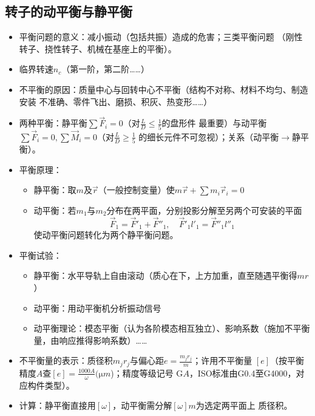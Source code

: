 \documentclass[12pt,a4paper]{article}
\newcommand{\tightlist}{\setlength{\parskip}{0pt}\setlength{\itemsep}{0pt}}
\newcommand{\hint}[1]{\textsf{（#1）}}
\newcommand{\minor}[1]{{\color{gray} #1}}
\newcommand{\then}{$\to$}
\begin{document}
\subsection{转子的动平衡与静平衡}
\begin{itemize}\tightlist
    \item 平衡问题的意义：减小振动\hint{包括共振}造成的危害；三类平衡问题\minor{
    \hint{刚性转子、挠性转子、机械在基座上的平衡}}。
    \item 临界转速$n_c$\hint{第一阶，第二阶……}
    \item 不平衡的原因：质量中心与回转中心不平衡\hint{结构不对称、材料不均匀、制造安装
    不准确、零件飞出、磨损、积灰、热变形……}
    \item 两种平衡：静平衡$\sum \vec{F}_i=0$\hint{对$\frac LD\leq\frac15$的盘形件
    最重要}与动平衡$\sum\vec{F}_i=0,\sum\vec{M}_i=0$\hint{对$\frac LD\geq\frac15$
    的细长元件不可忽视}；关系\hint{动平衡\then 静平衡}。
    \item 平衡原理：
    \begin{itemize}\tightlist
        \item 静平衡：取$m$及$\vec{r}$\hint{一般控制变量}使$m\vec{r}+\sum m_i
        \vec{r}_i=0$
        \item 动平衡：若$m_1$与$m_2$分布在两平面，分别投影分解至另两个可安装的平面
        \begin{equation}
        \vec{F}_1=\vec{F}'_1+\vec{F}''_1,\quad \vec{F}'_1l'_1=\vec{F}''_1l''_1
        \end{equation}
        使动平衡问题转化为两个静平衡问题。
    \end{itemize}
    \item 平衡试验：
    \begin{itemize}\tightlist
        \item 静平衡：水平导轨上自由滚动\hint{质心在下，上方加重，直至随遇平衡得$mr$}
        \item 动平衡：用动平衡机分析振动信号
        \item \minor{动平衡理论：模态平衡\hint{认为各阶模态相互独立}、影响系数\hint
        {施加不平衡量，由响应推得影响系数}……}
    \end{itemize}
    \item 不平衡量的表示：质径积$m_jr_j$与偏心距$e=\frac{m_jr_j}{m}$；许用不平衡量
    $[e]$\hint{按平衡精度$A$查$[e]=\frac{1000A}\omega(\si{\micro m}$)；精度等级记号
    G$A$，ISO标准由G0.4至G4000，对应构件类型}。
    \item \minor{计算：静平衡直接用$[\omega]$，动平衡需分解$[\omega]m$为选定两平面上
    质径积。}
\end{itemize}
\end{document}
